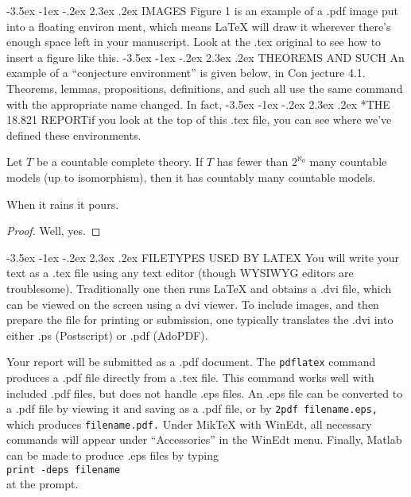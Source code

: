 \documentclass{article}
\makeatletter
\renewcommand\section{\@startsection{section}{1}{\z@}%
	{-3.5ex \@plus -1ex \@minus -.2ex}%
	{2.3ex \@plus.2ex}%
	{\normalfont\large}}
\makeatother
\begin{document}
\section{IMAGES}
Figure 1 is an example of a .pdf image put into a ﬂoating environ­
ment, which means LaTeX will draw it wherever there’s enough space
left in your manuscript. Look at the .tex original to see how to insert
a ﬁgure like this.
\section{THEOREMS AND SUCH}
   An example of a “conjecture environment” is given below, in Con­
jecture 4.1. Theorems, lemmas, propositions, deﬁnitions, and such all
use the same command with the appropriate name changed. In fact,
 \newpage \section*{THE 18.821 REPORT}if you look at the top of this .tex ﬁle, you can see where we’ve deﬁned these environments.\\
 \begin{conjecture}Let $T$ be a countable complete theory. If $T$ has fewer than $2^{\aleph_0}$ many countable models (up to isomorphism), then it has countably many countable models.
 \end{conjecture}
 \begin{theorem}
 	When it rains it pours.
 \end{theorem}
 \begin{proof}
 	Well, yes.
 \end{proof}
\section{FILETYPES USED BY LATEX}
You will write your text as a .tex ﬁle using any text editor (though WYSIWYG editors are troublesome). Traditionally one then runs \LaTeX{} and obtains a .dvi ﬁle, which can be viewed on the screen using a dvi viewer. To include images, and then prepare the ﬁle for printing or submission, one typically translates the .dvi into either .ps (Postscript) or .pdf (AdoPDF). 
\par{}\hspace{0.5 cm}Your report will be submitted as a .pdf document. The \texttt{pdflatex}
command produces a .pdf ﬁle directly from a .tex ﬁle. This command
works well with included .pdf ﬁles, but does not handle .eps ﬁles.
An .eps ﬁle can be converted to a .pdf ﬁle by viewing it and saving
as a .pdf ﬁle, or by \texttt{2pdf filename.eps,} which produces
\texttt{filename.pdf.} Under MikTeX with WinEdt, all necessary commands
will appear under “Accessories” in the WinEdt menu.
Finally, Matlab can be made to produce .eps ﬁles by typing\\
\texttt{print -deps filename}\\
at the prompt.     
\end{document}

